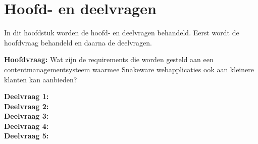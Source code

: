 \section{Hoofd- en deelvragen}
In dit hoofdstuk worden de hoofd- en deelvragen behandeld.
Eerst wordt de hoofdvraag behandeld en daarna de deelvragen.

\whitespace[2]
\textbf{Hoofdvraag:} Wat zijn de requirements die worden gesteld aan een contentmanagementsysteem waarmee
Snakeware webapplicaties ook aan kleinere klanten kan aanbieden?

\whitespace[2]
\textbf{Deelvraag 1:} \SubquestionOne   \\
\textbf{Deelvraag 2:} \SubquestionTwo   \\
\textbf{Deelvraag 3:} \SubquestionThree \\
\textbf{Deelvraag 4:} \SubquestionFour  \\
\textbf{Deelvraag 5:} \SubquestionFive  \\
